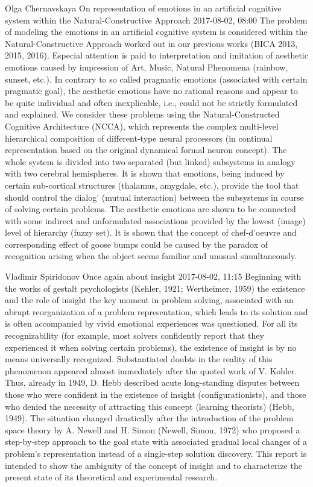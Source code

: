 \documentclass[10pt,fleqn,openany]{book} %
\begin{document}
\begin{enumerate}
		
		\paperabstract
		{Olga Chernavskaya}
		{On representation of emotions in an artificial cognitive system within the Natural-Constructive Approach}
		{2017-08-02, 08:00}
		{The problem of modeling the emotions in an artificial cognitive system is considered within the Natural-Constructive Approach worked out in our previous works (BICA 2013, 2015, 2016). Especial attention is paid to interpretation and imitation of aesthetic emotions caused by impression of Art, Music, Natural Phenomena (rainbow, sunset, etc.). In contrary to so called pragmatic emotions (associated with certain pragmatic goal), the aesthetic emotions have no rational reasons and appear to be quite individual and often inexplicable, i.e., could not be strictly formulated and explained.   We consider these problems using the Natural-Constructed Cognitive Architecture (NCCA), which represents the complex multi-level hierarchical composition of different-type neural processors (in continual representation based on the original dynamical formal neuron concept). The whole system is divided into two separated (but linked) subsystems in analogy with two cerebral hemispheres. It is shown that emotions, being induced by certain sub-cortical structures (thalamus, amygdale, etc.), provide the tool that should control the dialog' (mutual interaction) between the subsystems in course of solving certain problems. The aesthetic emotions are shown to be connected with some indirect and unformulated associations provided by the lowest (image) level of hierarchy (fuzzy set). It is shown that the concept of chef-d'oeuvre and corresponding effect of goose bumps could be caused by the paradox of recognition arising when the object seems familiar and unusual simultaneously.}
		
		
		\paperabstract
		{Vladimir Spiridonov}
		{Once again about insight}
		{2017-08-02, 11:15}
		{Beginning with the works of gestalt psychologists (Kehler, 1921; Wertheimer, 1959) the existence and the role of insight  the key moment in problem solving, associated with an abrupt reorganization of a problem representation, which leads to its solution and is often accompanied by vivid emotional experiences  was questioned. For all its recognizability (for example, most solvers confidently report that they experienced it when solving certain problems), the existence of insight is by no means universally recognized. Substantiated doubts in the reality of this phenomenon appeared almost immediately after the quoted work of V. Kohler. Thus, already in 1949, D. Hebb described acute long-standing disputes between those who were confident in the existence of insight (configurationists), and those who denied the necessity of attracting this concept (learning theorists) (Hebb, 1949). The situation changed drastically after the introduction of the problem space theory by A. Newell and H. Simon (Newell, Simon, 1972) who proposed a step-by-step approach to the goal state with associated gradual local changes of a problem's representation instead of a single-step solution discovery.  This report is intended to show the ambiguity of the concept of insight and to characterize the present state of its theoretical and experimental research.}
		

\end{enumerate}
\end{document}
